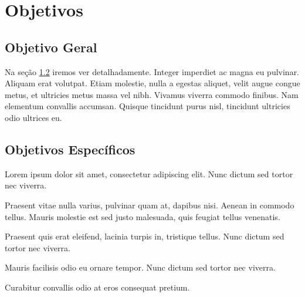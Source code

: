 \chapter{Objetivos}
\label{cap:objetivos}

\section{Objetivo Geral}
\label{sec:objetivos-geral}

Na seção \ref{sec:objetivos-especificos} iremos ver detalhadamente. Integer imperdiet ac magna eu pulvinar. Aliquam erat volutpat. Etiam molestie, nulla a egestas aliquet, velit augue congue metus, et ultricies metus massa vel nibh. Vivamus viverra commodo finibus. Nam elementum convallis accumsan. Quisque tincidunt purus nisl, tincidunt ultricies odio ultrices eu.

\section{Objetivos Específicos}
\label{sec:objetivos-especificos}

\begin{alineas}
	\item Lorem ipsum dolor sit amet, consectetur adipiscing elit. Nunc dictum sed tortor nec viverra.
	\item Praesent vitae nulla varius, pulvinar quam at, dapibus nisi. Aenean in commodo tellus. Mauris molestie est sed justo malesuada, quis feugiat tellus venenatis.
	\item Praesent quis erat eleifend, lacinia turpis in, tristique tellus. Nunc dictum sed tortor nec viverra.
	\item Mauris facilisis odio eu ornare tempor. Nunc dictum sed tortor nec viverra.
	\item Curabitur convallis odio at eros consequat pretium.
\end{alineas}